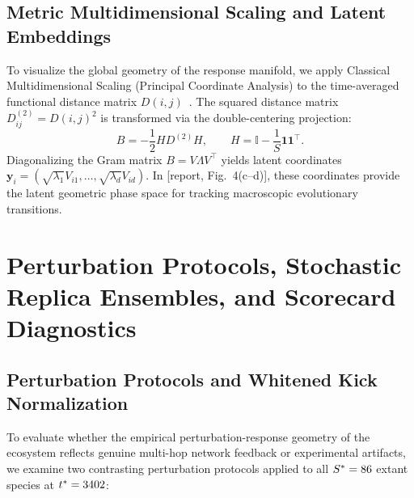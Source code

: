 \documentclass[11pt,a4paper]{article}
\newcommand{\R}[1]{\textcolor{blue!55!black}{[report, #1]}}
\begin{document}
\subsection{Metric Multidimensional Scaling and Latent Embeddings}

To visualize the global geometry of the response manifold, we apply Classical Multidimensional Scaling (Principal Coordinate Analysis) to the time-averaged functional distance matrix $D(i,j)$~\cite{barzon2024unraveling}. The squared distance matrix $D^{(2)}_{ij} = D(i,j)^2$ is transformed via the double-centering projection:
\begin{equation}
B = -\frac{1}{2} H D^{(2)} H, \qquad H = \mathbb{I} - \frac{1}{S} \mathbf{1} \mathbf{1}^\top.
\end{equation}
Diagonalizing the Gram matrix $B = V \Lambda V^\top$ yields latent coordinates $\mathbf{y}_i = (\sqrt{\lambda_1} V_{i1}, \dots, \sqrt{\lambda_d} V_{id})$. In \R{Fig.~4(c--d)}, these coordinates provide the latent geometric phase space for tracking macroscopic evolutionary transitions.

\section{Perturbation Protocols, Stochastic Replica Ensembles, and Scorecard Diagnostics}
\label{sec:scorecard_supp2}

\subsection{Perturbation Protocols and Whitened Kick Normalization}

To evaluate whether the empirical perturbation-response geometry of the ecosystem reflects genuine multi-hop network feedback or experimental artifacts, we examine two contrasting perturbation protocols applied to all $S^* = 86$ extant species at $t^* = 3402$:
\end{document}
